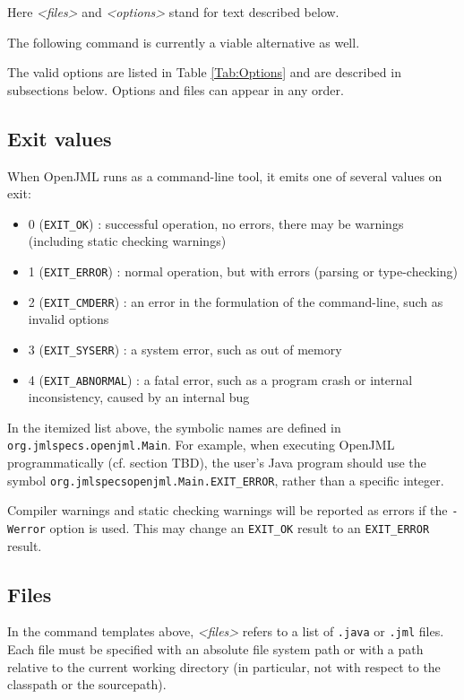 Here {\it <files>} and {\it <options>} stand for text described below.

The following command is currently a viable alternative as well.

The valid options are listed in Table \ref{Tab:Options} and are described in subsections below. Options and files can appear in any order.

\subsection{Exit values}

When OpenJML runs as a command-line tool, it emits one of several values on exit:
\begin{itemize}[noitemsep,nolistsep]
\item 0 (\texttt{EXIT\_OK}) : successful operation, no errors, there may be warnings (including static checking warnings)
\item 1 (\texttt{EXIT\_ERROR}) : normal operation, but with errors (parsing or type-checking)
\item 2 (\texttt{EXIT\_CMDERR}) : an error in the formulation of the command-line, such as invalid options
\item 3 (\texttt{EXIT\_SYSERR}) : a system error, such as out of memory
\item 4 (\texttt{EXIT\_ABNORMAL}) : a fatal error, such as a program crash or internal inconsistency, caused by an internal bug
\end{itemize}

In the itemized list above, the symbolic names are defined in {\tt org.jmlspecs.openjml.Main}. For example, when executing OpenJML programmatically (cf. section TBD), the user's Java program should use the 
symbol {\tt org.jmlspecsopenjml.Main.EXIT\_ERROR}, rather than a specific integer.

Compiler warnings and static checking warnings will be reported as errors if the \texttt{-Werror} option is used. This may change an \texttt{EXIT\_OK} result to an \texttt{EXIT\_ERROR} result.



\subsection{Files}

In the command templates above, {\it <files>} refers to a list of {\tt .java} or {\tt .jml} files.
Each file must be specified with an absolute file system path or with a path relative
to the current working directory (in particular, not with respect to the classpath or
the sourcepath). 

